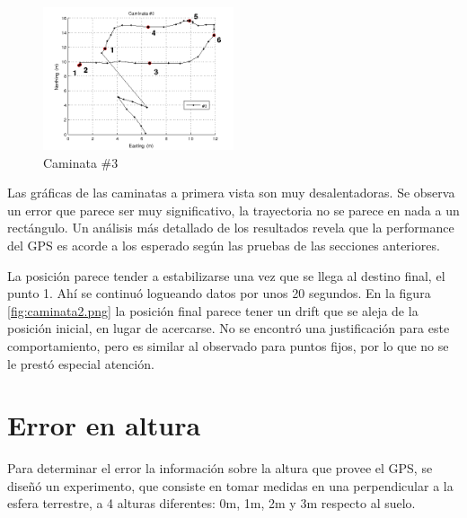 \documentclass[main]{subfiles}
\begin{document}
\begin{figure}
  \begin{center}
\vspace{-30pt}
    \includegraphics[width=0.5\textwidth]{./pics_gps/caminata3.png}
  \end{center}
\vspace{-20pt}
  \caption{Caminata \#3}
  \label{fig:caminata3}
\vspace{-10pt}
\end{figure}

Las gráficas de las caminatas a primera vista son muy desalentadoras. Se observa un error que parece ser muy significativo, la trayectoria no se parece en nada a un rectángulo. Un análisis más detallado de los resultados revela que la performance del GPS es acorde a los esperado según las pruebas de las secciones anteriores.

La posición parece tender a estabilizarse una vez que se llega al destino final, el punto 1. Ahí se continuó logueando datos por unos 20 segundos. En la figura \ref{fig:caminata2.png} la posición final parece tener un drift que se aleja de la posición inicial, en lugar de acercarse. No se encontró una justificación para este comportamiento, pero es similar al observado para puntos fijos, por lo que no se le prestó especial atención.

\section{Error en altura}
\label{sec:error-en-altura}

Para determinar el error la información sobre la altura que provee el GPS, se dise\~nó un experimento, que consiste en tomar medidas en una perpendicular a la esfera terrestre, a 4 alturas diferentes: 0m, 1m, 2m y 3m respecto al suelo.
\end{document}
